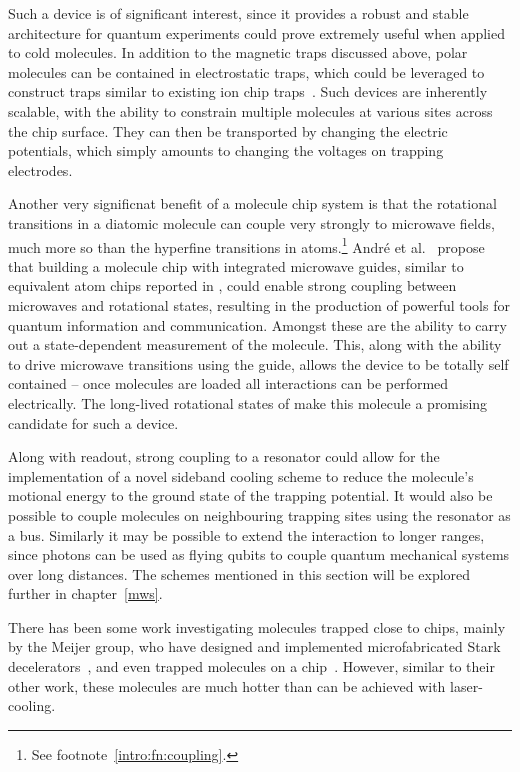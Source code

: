 Such a device is of significant interest, since it provides a robust and stable
architecture for quantum experiments could prove extremely useful when applied
to cold molecules. In addition to the magnetic traps discussed above, polar
molecules can be contained in electrostatic traps, which could be leveraged to
construct traps similar to existing ion chip traps~\cite{Andre2006,
Romaszko2020}. Such devices are inherently scalable, with the ability to
constrain multiple molecules at various sites across the chip surface. They can
then be transported by changing the electric potentials, which simply amounts
to changing the voltages on trapping electrodes.

Another very significnat benefit of a molecule chip system is that the
rotational transitions in a diatomic molecule can couple very strongly to
microwave fields, much more so than the hyperfine transitions in
atoms.\footnote{See footnote~\ref{intro:fn:coupling}.} Andr\'e et
al.~\cite{Andre2006} propose that building a molecule chip with integrated
microwave guides, similar to equivalent atom chips reported in
, could enable strong coupling between microwaves
and rotational states, resulting in the production of powerful tools for
quantum information and communication. Amongst these are the ability to carry
out a state-dependent measurement of the molecule. This, along with the ability
to drive microwave transitions using the guide, allows the device to be totally
self contained -- once molecules are loaded all interactions can be performed
electrically. The long-lived rotational states of \CaF{} make this molecule a
promising candidate for such a device.

Along with readout, strong coupling to a resonator could allow for the
implementation of a novel sideband cooling scheme to reduce the molecule's
motional energy to the ground state of the trapping potential. It would also be
possible to couple molecules on neighbouring trapping sites using the resonator as a bus.
Similarly it may be possible to extend the interaction to longer ranges, since
photons can be used as flying qubits to couple quantum mechanical systems over
long distances. The schemes mentioned in this section will be explored further
in chapter~\ref{mws}.

There has been some work investigating molecules trapped close to chips, mainly by
the Meijer group, who have designed and implemented microfabricated Stark
decelerators~\cite{Meek2008}, and even trapped molecules on a
chip~\cite{Meek2009}. However, similar to their other work, these molecules are
much hotter than can be achieved with laser-cooling.

